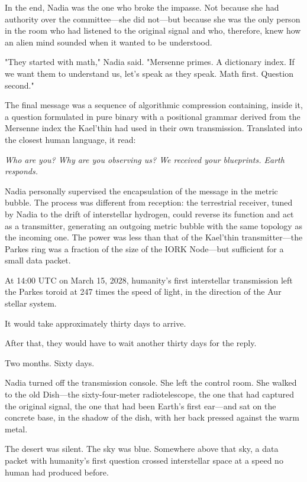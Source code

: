 \documentclass[11pt,a5paper,twoside]{book}
\begin{document}
In the end, Nadia was the one who broke the impasse. Not because she had authority over the committee—she did not—but because she was the only person in the room who had listened to the original signal and who, therefore, knew how an alien mind sounded when it wanted to be understood.

"They started with math," Nadia said. "Mersenne primes. A dictionary index. If we want them to understand us, let's speak as they speak. Math first. Question second."

The final message was a sequence of algorithmic compression containing, inside it, a question formulated in pure binary with a positional grammar derived from the Mersenne index the Kael'thin had used in their own transmission. Translated into the closest human language, it read:

\textit{Who are you? Why are you observing us? We received your blueprints. Earth responds.}

Nadia personally supervised the encapsulation of the message in the metric bubble. The process was different from reception: the terrestrial receiver, tuned by Nadia to the drift of interstellar hydrogen, could reverse its function and act as a transmitter, generating an outgoing metric bubble with the same topology as the incoming one. The power was less than that of the Kael'thin transmitter—the Parkes ring was a fraction of the size of the IORK Node—but sufficient for a small data packet.

At 14:00 UTC on March 15, 2028, humanity's first interstellar transmission left the Parkes toroid at 247 times the speed of light, in the direction of the Aur stellar system.

It would take approximately thirty days to arrive.

After that, they would have to wait another thirty days for the reply.

Two months. Sixty days.

Nadia turned off the transmission console. She left the control room. She walked to the old Dish—the sixty-four-meter radiotelescope, the one that had captured the original signal, the one that had been Earth's first ear—and sat on the concrete base, in the shadow of the dish, with her back pressed against the warm metal.

The desert was silent. The sky was blue. Somewhere above that sky, a data packet with humanity's first question crossed interstellar space at a speed no human had produced before.
\end{document}
